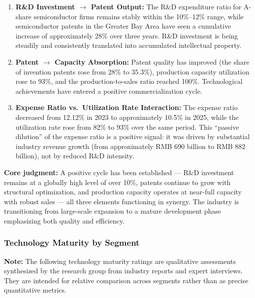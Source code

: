 \documentclass[12pt,a4paper]{article}
\begin{document}
\begin{enumerate}[label=(\arabic*)]
    \item \textbf{R\&D Investment $\rightarrow$ Patent Output:} The R\&D
          expenditure ratio for A-share semiconductor firms remains stably
          within the 10\%--12\% range, while semiconductor patents in the
          Greater Bay Area have seen a cumulative increase of approximately
          28\% over three years. R\&D investment is being steadily and
          consistently translated into accumulated intellectual property.
    \item \textbf{Patent $\rightarrow$ Capacity Absorption:} Patent quality
          has improved (the share of invention patents rose from 28\% to 35.3\%),
          production capacity utilization rose to 93\%, and the production-to-sales
          ratio reached 100\%. Technological achievements have entered a positive
          commercialization cycle.
    \item \textbf{Expense Ratio vs.\ Utilization Rate Interaction:} The expense
          ratio decreased from 12.12\% in 2023 to approximately 10.5\% in 2025,
          while the utilization rate rose from 82\% to 93\% over the same period.
          This ``passive dilution'' of the expense ratio is a positive signal:
          it was driven by substantial industry revenue growth (from approximately
          RMB 690 billion to RMB 882 billion), not by reduced R\&D intensity.
\end{enumerate}

\textbf{Core judgment:} A positive cycle has been established — R\&D investment
remains at a globally high level of over 10\%, patents continue to grow with
structural optimization, and production capacity operates at near-full capacity
with robust sales — all three elements functioning in synergy. The industry is
transitioning from large-scale expansion to a mature development phase
emphasizing both quality and efficiency.

\subsubsection{Technology Maturity by Segment}

{\footnotesize\textbf{Note:} The following technology maturity ratings are
qualitative assessments synthesized by the research group from industry reports
and expert interviews. They are intended for relative comparison across segments
rather than as precise quantitative metrics.}
\end{document}
